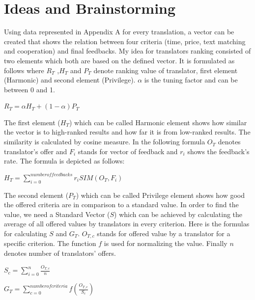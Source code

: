 \section{Ideas and Brainstorming}
Using data represented in Appendix A for every translation, a vector can be created that shows the relation between four criteria (time, price, text matching and cooperation) and final feedbacks. My idea for translators ranking consisted of two elements which both are based on the defined vector. It is formulated as follows where $R_T$ ,$H_T$ and $P_T$ denote ranking value of translator, first element (Harmonic) and second element (Privilege). $\alpha$ is the tuning factor and can be between 0 and 1.

\begin{center}
$R_T = \alpha H_T + (1-\alpha)P_T$ \\
\end{center}

The first element ($H_T$) which can be called Harmonic element shows how similar the vector is to high-ranked results and how far it is from low-ranked results. The similarity is calculated by cosine measure. In the following formula $O_T$ denotes translator's offer and $F_i$ stands for vector of feedback and $r_i$ shows the feedback's rate. The formula is depicted as follows:

\begin{center}
$H_T = \sum_{i=0}^{number of feedbacks} r_i SIM(O_T, F_i)$ \\
\end{center}

The second element ($P_T$) which can be called Privilege element shows how good the offered criteria are in comparison to a standard value. In order to find the value, we need a Standard Vector ($S$) which can be achieved by calculating the average of all offered values by translators in every criterion. Here is the formulas for calculating $S$ and $G_T$. $O_{T,c}$ stands for offered value by a translator for a specific criterion. The function $f$ is used for normalizing the value. Finally $n$ denotes number of translators' offers.

\begin{center}
$S_c = \sum_{i=0}^{n} \frac{O_{T,c}}{n}$ \\
\end{center}

\begin{center}
$G_T = \sum_{c=0}^{number of criteria} f(\frac{O_{T,c}}{S_c}) $ \\
\end{center}

